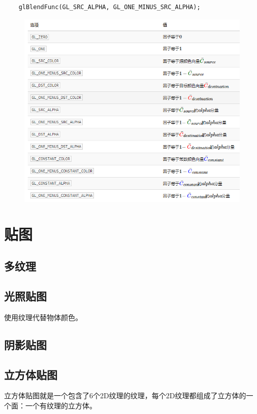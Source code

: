 \documentclass[UTF8,a4paper,12pt]{ctexbook}
\begin{document}
			\begin{lstlisting}
	glBlendFunc(GL_SRC_ALPHA, GL_ONE_MINUS_SRC_ALPHA);			
			\end{lstlisting}
			
			\begin{figure}[H]
				\centering
				\includegraphics[width=.95\linewidth]{blending_table}
			\end{figure}
			
	
\chapter{贴图}

	\section{多纹理}
	

	\section{光照贴图}
		使用纹理代替物体颜色。

	\section{阴影贴图}
	

	\section{立方体贴图}
		立方体贴图就是一个包含了6个2D纹理的纹理，每个2D纹理都组成了立方体的一个面：一个有纹理的立方体。
		
\end{document}
